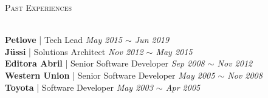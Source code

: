 \documentclass[a4paper]{article}
\newcommand{\lineunder} {
    \vspace*{-8pt} \\
    \hspace*{-18pt} \hrulefill \\
}
\newcommand{\header} [1] {
    \vspace{2mm}
    {\hspace*{-18pt}\vspace*{7pt} \textsc{#1}}
    \vspace*{-6pt} \lineunder
    \vspace{1mm}
}
\begin{document}
\header{Past Experiences}
\textbf{Petlove} | Tech Lead \hfill \textit{May 2015 $\sim$ Jun 2019} \\
\textbf{Jüssi} | Solutions Architect \hfill \textit{Nov 2012 $\sim$ May 2015} \\
\textbf{Editora Abril} | Senior Software Developer \hfill \textit{Sep 2008 $\sim$ Nov 2012} \\
\textbf{Western Union} | Senior Software Developer \hfill \textit{May 2005 $\sim$ Nov 2008} \\
\textbf{Toyota} | Software Developer \hfill \textit{May 2003 $\sim$ Apr 2005} \\
\end{document}
